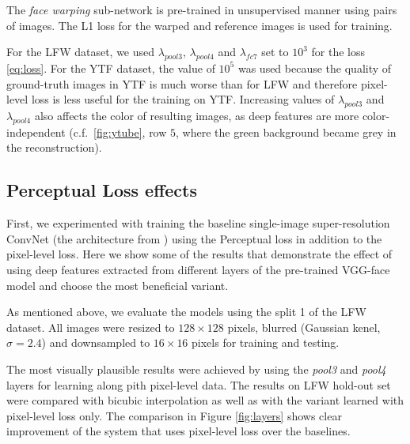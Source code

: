 The \emph{face warping} sub-network is pre-trained in unsupervised manner using pairs of images. The L1 loss for the warped and reference images is used for training.

For the LFW dataset, we used $\lambda_{pool3}$, $\lambda_{pool4}$ and $\lambda_{fc7}$ set to $10^3$ for the loss \ref{eq:loss}. For the YTF dataset, the value of $10^5$ was used because the quality of ground-truth images in YTF is much worse than for LFW and therefore pixel-level loss is less useful for the training on YTF. Increasing values of $\lambda_{pool3}$ and $\lambda_{pool4}$ also affects the color of resulting images, as deep features are more color-independent (c.f.~\ref{fig:ytube}, row $5$, where the green background became grey in the reconstruction). 





\subsection{Perceptual Loss effects}
\label{sec:perceptual}


First, we experimented with training the baseline single-image super-resolution ConvNet (the architecture from \cite{TuzelTH16}) using the Perceptual loss in addition to the pixel-level loss. Here we show some of the results that demonstrate the effect of using deep features extracted from different layers of the pre-trained VGG-face model and choose the most beneficial variant.

As mentioned above, we evaluate the models using the split 1 of the LFW dataset. All images were resized to $128\times128$ pixels, blurred (Gaussian kenel, $\sigma=2.4$) and downsampled to $16\times16$ pixels for training and testing.


The most visually plausible results were achieved by using the \emph{pool3} and \emph{pool4} layers for learning along pith pixel-level data. The results on LFW hold-out set were compared with bicubic interpolation as well as with the variant learned with pixel-level loss only. The comparison in Figure \ref{fig:layers} shows clear improvement of the system that uses pixel-level loss over the baselines. 

